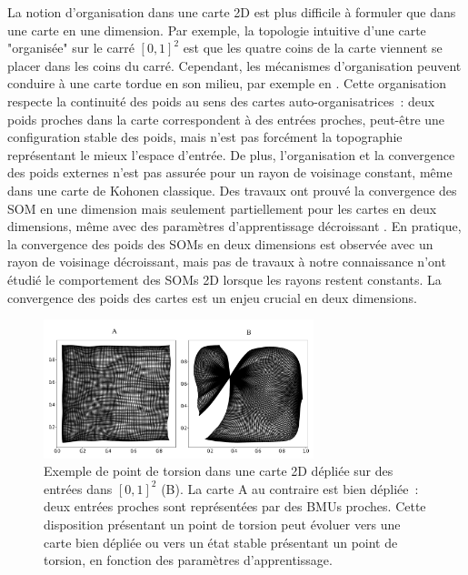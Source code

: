 \documentclass[../main]{subfiles}
\begin{document}
La notion d'organisation dans une carte 2D est plus difficile à formuler que dans une carte en une dimension. 
Par exemple, la topologie intuitive d'une carte "organisée" sur le carré $[0,1]^2$ est que les quatre coins de la carte viennent se placer dans les coins du carré.
Cependant, les mécanismes d'organisation peuvent conduire à une carte tordue en son milieu, par exemple en \label{fig:torsion}. 
Cette organisation respecte la continuité des poids au sens des cartes auto-organisatrices~: deux poids proches dans la carte correspondent à des entrées proches, peut-être une configuration stable des poids, mais n'est pas forcément la topographie représentant le mieux l'espace d'entrée. 
De plus, l'organisation et la convergence des poids externes n'est pas assurée pour un rayon de voisinage constant, même dans une carte de Kohonen classique. Des travaux ont prouvé la convergence des SOM en une dimension mais seulement partiellement pour les cartes en deux dimensions, même avec des paramètres d'apprentissage décroissant \cite{flanagan_self-organisation_1996}. En pratique, la convergence des poids des SOMs en deux dimensions est observée avec un rayon de voisinage décroissant, mais pas de travaux à notre connaissance n'ont étudié le comportement des SOMs 2D lorsque les rayons restent constants. La convergence des poids des cartes est un enjeu crucial en deux dimensions.

\begin{figure}
	\centering\includegraphics[width=0.7\textwidth]{we_cub_example.pdf}
	\caption{Exemple de point de torsion dans une carte 2D dépliée sur des entrées dans $[0,1]^2$ (B). La carte A au contraire est bien dépliée~: deux entrées proches sont représentées par des BMUs proches. Cette disposition présentant un point de torsion peut évoluer vers une carte bien dépliée ou vers un état stable présentant un point de torsion, en fonction des paramètres d'apprentissage. \label{fig:torsion}
	}
\end{figure}
\end{document}
